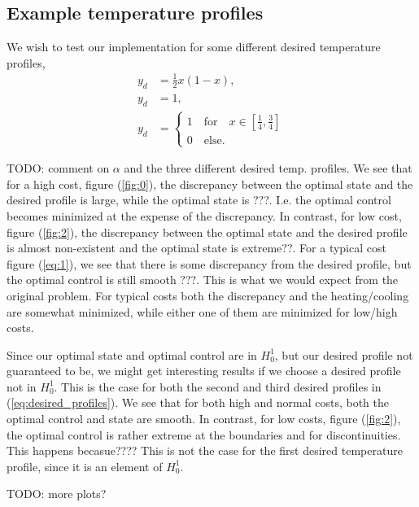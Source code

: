 \subsection{Example temperature profiles}
We wish to test our implementation for some different desired temperature profiles,
\begin{align}
    \label{eq:desired_profiles}
    y_d &= \frac{1}{2}x(1-x), \\
    y_d &= 1, \\
    y_d &= \begin{cases}
        1 \quad \text{for} \quad x \in \left[ \frac{1}{4}, \frac{3}{4}\right] \\
        0 \quad \text{else}.
    \end{cases}
\end{align}

TODO: comment on \( \alpha \) and the three different desired temp. profiles.
We see that for a high cost, figure (\ref{fig:0}), the discrepancy between the optimal state and the desired profile is large, while the optimal state is ???.
I.e. the optimal control becomes minimized at the expense of the discrepancy.
In contrast, for low cost, figure (\ref{fig:2}), the discrepancy between the optimal state and the desired profile is almost non-existent and the optimal state is extreme??.
For a typical cost figure (\ref{eq:1}), we see that there is some discrepancy from the desired profile, but the optimal control is still smooth ???.
This is what we would expect from the original problem. For typical costs both the discrepancy and the heating/cooling are somewhat minimized, while either one of them are minimized for low/high costs.

Since our optimal state and optimal control are in $H_0^1$, but our desired profile not guaranteed to be, we might get interesting results if we choose a desired profile not in $H_0^1$.
This is the case for both the second and third desired profiles in (\ref{eq:desired_profiles}).
We see that for both high and normal costs, both the optimal control and state are smooth.
In contrast, for low costs, figure (\ref{fig:2}), the optimal control is rather extreme at the boundaries and for discontinuities. This happens becasue????
This is not the case for the first desired temperature profile, since it is an element of $H_0^1$.

TODO: more plots?


